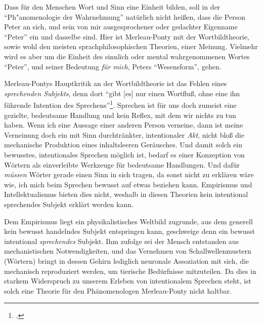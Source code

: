 \documentclass[a4paper, 12pt]{article}
\begin{document}
\begin{onehalfspace}
Dass für den Menschen Wort und Sinn eine Einheit bilden, soll in der "`Ph"anomenologie der Wahrnehmung"' natürlich nicht heißen, dass die Person Peter an sich, und sein von mir ausgesprochener oder gedachter Eigenname "`Peter"' ein und dasselbe sind. Hier ist Merleau-Ponty mit der Wortbildtheorie, sowie wohl den meisten sprachphilosophischen Theorien, einer Meinung. Vielmehr wird es aber um die Einheit des sinnlich oder mental wahrgenommenen Wortes "`Peter"', und seiner Bedeutung \emph{für mich}, Peters "`Wesensform"', gehen. 

Merleau-Pontys Hauptkritik an der Wortbildtheorie ist das Fehlen eines \emph{sprechenden Subjekts}, denn dort "`gibt [es] nur einen Wortfluß, ohne eine ihn führende Intention des Sprechens"'\footnote{\Cite[Siehe][S. 208]{merleau1966phanomenologie}.}. Sprechen ist für uns doch zumeist eine gezielte, bedeutsame Handlung und kein Reflex, mit dem wir nichts zu tun haben. Wenn ich eine Aussage einer anderen Person verneine, dann ist meine Verneinung doch ein mit Sinn durchtränkter, intentionaler \emph{Akt}, nicht bloß die mechanische Produktion eines inhaltsleeren Geräusches. Und damit solch ein bewusstes, intentionales Sprechen möglich ist, bedarf es einer Konzeption von Wörtern als einverleibte Werkzeuge für bedeutsame Handlungen. Und dafür \emph{müssen} Wörter gerade einen Sinn in sich tragen, da sonst nicht zu erklären wäre wie, ich mich beim Sprechen bewusst auf etwas beziehen kann. Empirismus und Intellektualismus bieten dies nicht, weshalb in diesen Theorien kein intentional sprechendes Subjekt erklärt werden kann.

Dem Empirismus liegt ein physikalistisches Weltbild zugrunde, aus dem generell kein bewusst handelndes Subjekt entspringen kann, geschweige denn ein bewusst intentional \emph{sprechendes} Subjekt. Ihm zufolge sei der Mensch entstanden aus mechanistischen Notwendigkeiten, und das Vernehmen von Schallwellenmustern (Wörtern) bringt in dessen Gehirn lediglich neuronale Assoziation mit sich, die mechanisch reproduziert werden, um tierische Bedürfnisse mitzuteilen. Da dies in starkem Widerspruch zu unserem Erleben von intentionalem Sprechen steht, ist solch eine Theorie für den Phänomenologen Merleau-Ponty nicht haltbar.


\end{onehalfspace}
\end{document}
